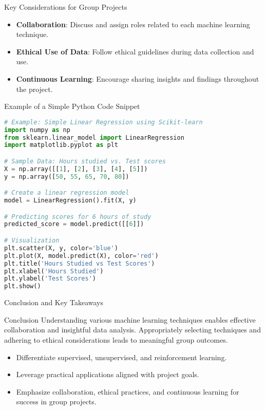 \documentclass[aspectratio=169]{beamer}
\begin{document}
\begin{frame}{Key Considerations for Group Projects}
  \begin{itemize}
    \item \textbf{Collaboration}: Discuss and assign roles related to each machine learning technique.
    \item \textbf{Ethical Use of Data}: Follow ethical guidelines during data collection and use.
    \item \textbf{Continuous Learning}: Encourage sharing insights and findings throughout the project.
  \end{itemize}
\end{frame}

\begin{frame}[fragile]{Example of a Simple Python Code Snippet}
  \begin{lstlisting}[language=Python]
# Example: Simple Linear Regression using Scikit-learn
import numpy as np
from sklearn.linear_model import LinearRegression
import matplotlib.pyplot as plt

# Sample Data: Hours studied vs. Test scores
X = np.array([[1], [2], [3], [4], [5]])
y = np.array([50, 55, 65, 70, 80])

# Create a linear regression model
model = LinearRegression().fit(X, y)

# Predicting scores for 6 hours of study
predicted_score = model.predict([[6]])

# Visualization
plt.scatter(X, y, color='blue')
plt.plot(X, model.predict(X), color='red')
plt.title('Hours Studied vs Test Scores')
plt.xlabel('Hours Studied')
plt.ylabel('Test Scores')
plt.show()
  \end{lstlisting}
\end{frame}

\begin{frame}{Conclusion and Key Takeaways}
  \begin{block}{Conclusion}
    Understanding various machine learning techniques enables effective collaboration and insightful data analysis. Appropriately selecting techniques and adhering to ethical considerations leads to meaningful group outcomes.
  \end{block}
  
  \begin{itemize}
    \item Differentiate supervised, unsupervised, and reinforcement learning.
    \item Leverage practical applications aligned with project goals.
    \item Emphasize collaboration, ethical practices, and continuous learning for success in group projects.
  \end{itemize}
\end{frame}
\end{document}
